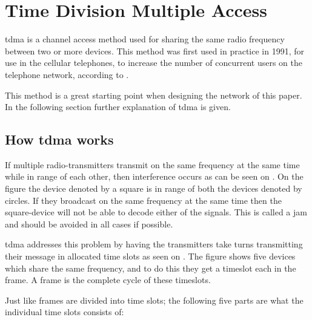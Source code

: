 \chapter{Time Division Multiple Access}\label{TDMA}

\gls{tdma} is a channel access method used for sharing the same radio frequency between two or more devices.
This method was first used in practice in 1991, for use in the cellular telephones, to increase the number of concurrent users on the telephone network, according to \citet{networkencyclopedia2013time}.

This method is a great starting point when designing the network of this paper.
In the following section further explanation of \gls{tdma} is given.

\section{How \acrshort{tdma} works}

If multiple radio-transmitters transmit on the same frequency at the same time while in range of each other, then interference occurs as can be seen on . 
On the figure the device denoted by a square is in range of both the devices denoted by circles. 
If they broadcast on the same frequency at the same time then the square-device will not be able to decode either of the signals.\cite{networkencyclopedia2013time, networkencyclopedia2013advanced}
This is called a jam and should be avoided in all cases if possible.


\gls{tdma} addresses this problem by having the transmitters take turns transmitting their message in allocated time slots as seen on .
The figure shows five devices which share the same frequency, and to do this they get a timeslot each in the frame.
A frame is the complete cycle of these timeslots.


\noindent
Just like frames are divided into time slots; the following five parts are what the individual time slots consists of:

